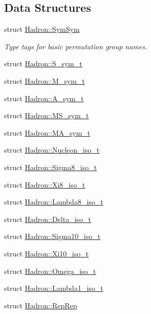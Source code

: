 \subsection*{Data Structures}
\begin{DoxyCompactItemize}
\item 
struct \mbox{\hyperlink{structHadron_1_1SymSym}{Hadron\+::\+Sym\+Sym}}
\begin{DoxyCompactList}\small\item\em Type tags for basic permutation group names. \end{DoxyCompactList}\item 
struct \mbox{\hyperlink{structHadron_1_1S__sym__t}{Hadron\+::\+S\+\_\+sym\+\_\+t}}
\item 
struct \mbox{\hyperlink{structHadron_1_1M__sym__t}{Hadron\+::\+M\+\_\+sym\+\_\+t}}
\item 
struct \mbox{\hyperlink{structHadron_1_1A__sym__t}{Hadron\+::\+A\+\_\+sym\+\_\+t}}
\item 
struct \mbox{\hyperlink{structHadron_1_1MS__sym__t}{Hadron\+::\+M\+S\+\_\+sym\+\_\+t}}
\item 
struct \mbox{\hyperlink{structHadron_1_1MA__sym__t}{Hadron\+::\+M\+A\+\_\+sym\+\_\+t}}
\item 
struct \mbox{\hyperlink{structHadron_1_1Nucleon__iso__t}{Hadron\+::\+Nucleon\+\_\+iso\+\_\+t}}
\item 
struct \mbox{\hyperlink{structHadron_1_1Sigma8__iso__t}{Hadron\+::\+Sigma8\+\_\+iso\+\_\+t}}
\item 
struct \mbox{\hyperlink{structHadron_1_1Xi8__iso__t}{Hadron\+::\+Xi8\+\_\+iso\+\_\+t}}
\item 
struct \mbox{\hyperlink{structHadron_1_1Lambda8__iso__t}{Hadron\+::\+Lambda8\+\_\+iso\+\_\+t}}
\item 
struct \mbox{\hyperlink{structHadron_1_1Delta__iso__t}{Hadron\+::\+Delta\+\_\+iso\+\_\+t}}
\item 
struct \mbox{\hyperlink{structHadron_1_1Sigma10__iso__t}{Hadron\+::\+Sigma10\+\_\+iso\+\_\+t}}
\item 
struct \mbox{\hyperlink{structHadron_1_1Xi10__iso__t}{Hadron\+::\+Xi10\+\_\+iso\+\_\+t}}
\item 
struct \mbox{\hyperlink{structHadron_1_1Omega__iso__t}{Hadron\+::\+Omega\+\_\+iso\+\_\+t}}
\item 
struct \mbox{\hyperlink{structHadron_1_1Lambda1__iso__t}{Hadron\+::\+Lambda1\+\_\+iso\+\_\+t}}
\item 
struct \mbox{\hyperlink{structHadron_1_1RepRep}{Hadron\+::\+Rep\+Rep}}

\end{DoxyCompactItemize}
